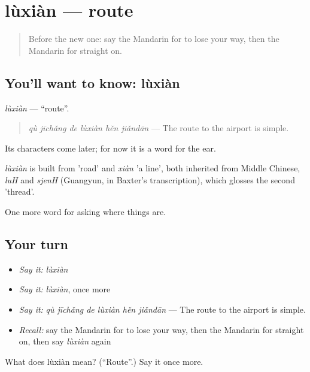 \section[lùxiàn]{lùxiàn — route}

\label{lesson:ZH-C197-luxian}



\begin{quote}
Before the new one: say the Mandarin for to lose your way, then the Mandarin for straight on.
\end{quote}

\subsection*{You'll want to know: lùxiàn}
\emph{lùxiàn} — \textquotedblleft{}route\textquotedblright{}.

\begin{quote}
\emph{qù jīchǎng de lùxiàn hěn jiǎndān} — The route to the airport is simple.
\end{quote}

Its characters come later; for now it is a word for the ear.

\begin{cousinweb}
\emph{lùxiàn} is built from  'road' and \emph{xiàn} 'a line', both inherited from Middle Chinese, \emph{luH} and \emph{sjenH} (Guangyun, in Baxter's transcription), which glosses the second 'thread'.
\end{cousinweb}

\begin{grammarlens}[title={What you've built}]
One more word for asking where things are.
\end{grammarlens}

\subsection*{Your turn}
\begin{itemize}
\raggedright
  \item \emph{Say it:} \emph{lùxiàn}
  \item \emph{Say it:} \emph{lùxiàn}, once more
  \item \emph{Say it:} \emph{qù jīchǎng de lùxiàn hěn jiǎndān} — The route to the airport is simple.
  \item \emph{Recall:} say the Mandarin for to lose your way, then the Mandarin for straight on, then say \emph{lùxiàn} again
\end{itemize}

\begin{tcolorbox}[breakable,colback=teal!4,colframe=teal!35!black,title={Before you move on}]
What does lùxiàn mean? (\textquotedblleft{}Route\textquotedblright{}.) Say it once more.
\end{tcolorbox}
